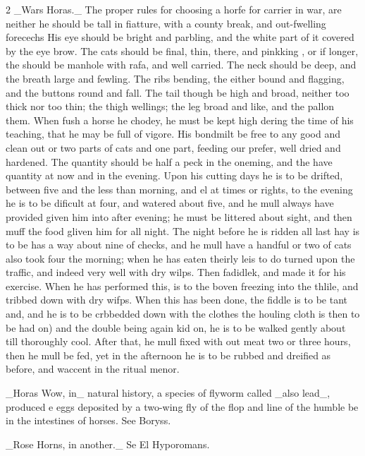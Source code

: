 \documentclass[10pt]{article}
\begin{document}
\begin{multicols}{2}
\_Wars Horas.\_ The proper rules for choosing a horfe for carrier in war, are neither he should be tall in fiatture, with a county break, and out-fwelling forecechs His eye should be bright and parbling, and the white part of it covered by the eye brow. The cats should be final, thin, there, and pinkking , or if longer, the should be manhole with rafa, and well carried. The neck should be deep, and the breath large and fewling. The ribs bending, the either bound and flagging, and the buttons round and fall. The tail though be high and broad, neither too thick nor too thin; the thigh wellings; the leg broad and like, and the pallon them. When fush a horse he chodey, he must be kept high dering the time of his teaching, that he may be full of vigore. His bondmilt be free to any good and clean out or two parts of cats and one part, feeding our prefer, well dried and hardened. The quantity should be half a peck in the oneming, and the have quantity at now and in the evening. Upon his cutting days he is to be drifted, between five and the less than morning, and el at times or rights, to the evening he is to be dificult at four, and watered about five, and he mull always have provided given him into after evening; he must be littered about sight, and then muff the food gliven him for all night. The night before he is ridden all last hay is to be has a way about nine of checks, and he mull have a handful or two of cats also took four the morning; when he has eaten theirly leis to do turned upon the traffic, and indeed very well with dry wilps. Then fadidlek, and made it for his exercise. When he has performed this, is to the boven freezing into the thlile, and tribbed down with dry wifps. When this has been done, the fiddle is to be tant and, and he is to be crbbedded down with the clothes the houling cloth is then to be had on) and the double being again kid on, he is to be walked gently about till thoroughly cool. After that, he mull fixed with out meat two or three hours, then he mull be fed, yet in the afternoon he is to be rubbed and dreified as before, and waccent in the ritual menor.

\_Horas Wow, in\_ natural history, a species of flyworm called \_also lead\_, produced e eggs deposited by a two-wing fly of the flop and line of the humble be in the intestines of horses. See Boryss.

\_Rose Horns, in another.\_ Se El Hyporomans.


\end{multicols}
\end{document}
